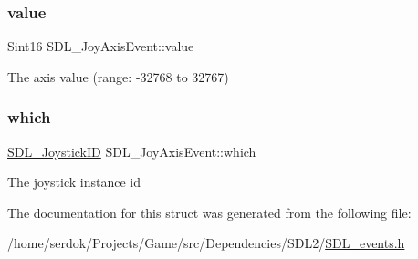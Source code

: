 \subsubsection{\texorpdfstring{value}{value}}
{\footnotesize\ttfamily Sint16 S\+D\+L\+\_\+\+Joy\+Axis\+Event\+::value}

The axis value (range\+: -\/32768 to 32767) \mbox{\label{structSDL__JoyAxisEvent_a965719f4703a7091bcc5f07f79fcf7e1}} 
\subsubsection{\texorpdfstring{which}{which}}
{\footnotesize\ttfamily \hyperlink{SDL__joystick_8h_a3c3d32500cb08f76ee8077983912c0bd}{S\+D\+L\+\_\+\+Joystick\+ID} S\+D\+L\+\_\+\+Joy\+Axis\+Event\+::which}

The joystick instance id 

The documentation for this struct was generated from the following file\+:\begin{DoxyCompactItemize}
\item 
/home/serdok/\+Projects/\+Game/src/\+Dependencies/\+S\+D\+L2/\hyperlink{SDL__events_8h}{S\+D\+L\+\_\+events.\+h}\end{DoxyCompactItemize}
